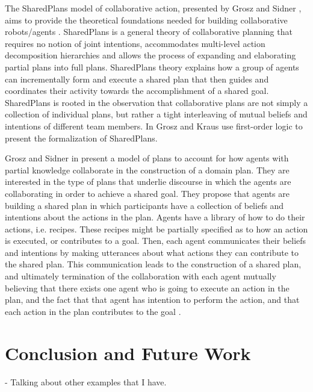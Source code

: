 The SharedPlans model of collaborative action, presented by Grosz and Sidner
\cite{grosz:planning-acting,grosz:collaboration,grosz:plans-discourse}, aims
to provide the theoretical foundations needed for building collaborative
robots/agents \cite{grosz:collaborative-systems}. SharedPlans is a general
theory of collaborative planning that requires no notion of joint intentions,
accommodates multi-level action decomposition hierarchies and allows the process
of expanding and elaborating partial plans into full plans. SharedPlans theory
explains how a group of agents can incrementally form and execute a shared plan
that then guides and coordinates their activity towards the accomplishment of a
shared goal. SharedPlans is rooted in the observation that collaborative plans
are not simply a collection of individual plans, but rather a tight interleaving
of mutual beliefs and intentions of different team members. In
\cite{grosz:collaboration} Grosz and Kraus use first-order logic to present the
formalization of SharedPlans.

Grosz and Sidner in \cite{grosz:plans-discourse} present a model of plans to
account for how agents with partial knowledge collaborate in the construction of
a domain plan. They are interested in the type of plans that underlie discourse
in which the agents are collaborating in order to achieve a shared goal. They
propose that agents are building a shared plan in which participants have a
collection of beliefs and intentions about the actions in the plan. Agents have
a library of how to do their actions, i.e. recipes. These recipes might be
partially specified as to how an action is executed, or contributes to a goal.
Then, each agent communicates their beliefs and intentions by making utterances
about what actions they can contribute to the shared plan. This communication
leads to the construction of a shared plan, and ultimately termination of the
collaboration with each agent mutually believing that there exists one agent who
is going to execute an action in the plan, and the fact that that agent has
intention to perform the action, and that each action in the plan contributes to
the goal \cite{grosz:plans-discourse,lochbaum:plan-models}.

\section{Conclusion and Future Work}

- Talking about other examples that I have.


